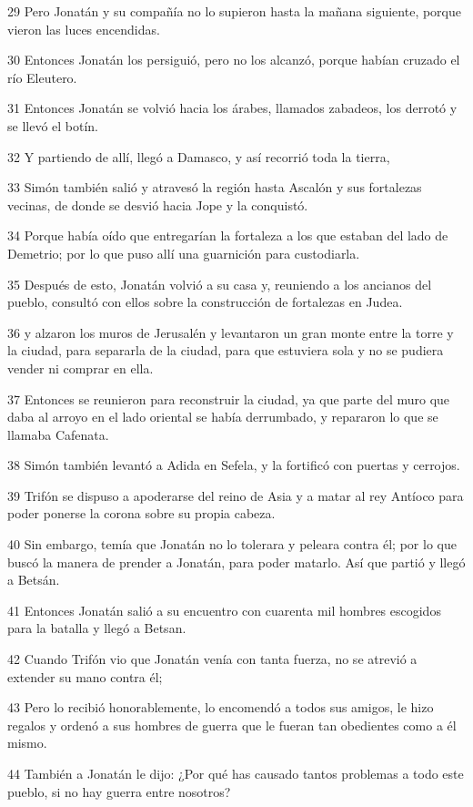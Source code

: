 \par 29 Pero Jonatán y su compañía no lo supieron hasta la mañana siguiente, porque vieron las luces encendidas.
\par 30 Entonces Jonatán los persiguió, pero no los alcanzó, porque habían cruzado el río Eleutero.
\par 31 Entonces Jonatán se volvió hacia los árabes, llamados zabadeos, los derrotó y se llevó el botín.
\par 32 Y partiendo de allí, llegó a Damasco, y así recorrió toda la tierra,
\par 33 Simón también salió y atravesó la región hasta Ascalón y sus fortalezas vecinas, de donde se desvió hacia Jope y la conquistó.
\par 34 Porque había oído que entregarían la fortaleza a los que estaban del lado de Demetrio; por lo que puso allí una guarnición para custodiarla.
\par 35 Después de esto, Jonatán volvió a su casa y, reuniendo a los ancianos del pueblo, consultó con ellos sobre la construcción de fortalezas en Judea.
\par 36 y alzaron los muros de Jerusalén y levantaron un gran monte entre la torre y la ciudad, para separarla de la ciudad, para que estuviera sola y no se pudiera vender ni comprar en ella.
\par 37 Entonces se reunieron para reconstruir la ciudad, ya que parte del muro que daba al arroyo en el lado oriental se había derrumbado, y repararon lo que se llamaba Cafenata.
\par 38 Simón también levantó a Adida en Sefela, y la fortificó con puertas y cerrojos.
\par 39 Trifón se dispuso a apoderarse del reino de Asia y a matar al rey Antíoco para poder ponerse la corona sobre su propia cabeza.
\par 40 Sin embargo, temía que Jonatán no lo tolerara y peleara contra él; por lo que buscó la manera de prender a Jonatán, para poder matarlo. Así que partió y llegó a Betsán.
\par 41 Entonces Jonatán salió a su encuentro con cuarenta mil hombres escogidos para la batalla y llegó a Betsan.
\par 42 Cuando Trifón vio que Jonatán venía con tanta fuerza, no se atrevió a extender su mano contra él;
\par 43 Pero lo recibió honorablemente, lo encomendó a todos sus amigos, le hizo regalos y ordenó a sus hombres de guerra que le fueran tan obedientes como a él mismo.
\par 44 También a Jonatán le dijo: ¿Por qué has causado tantos problemas a todo este pueblo, si no hay guerra entre nosotros?
